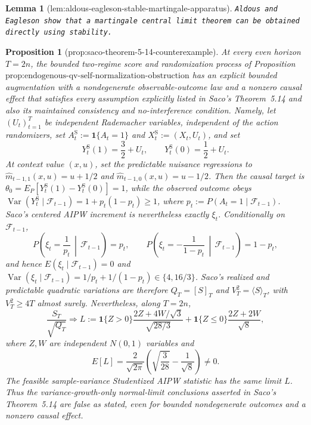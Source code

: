 \documentclass{article}
\newtheorem{lemma}{Lemma}
\newtheorem{proposition}{Proposition}
\begin{document}
\begin{lemma}[lem:aldous-eagleson-stable-martingale-apparatus]\label{lem:aldous-eagleson-stable-martingale-apparatus}
\texttt{Aldous and Eagleson show that a martingale central limit theorem can be obtained directly using stability.}
\end{lemma}

\begin{proposition}[prop:saco-theorem-5-14-counterexample]\label{prop:saco-theorem-5-14-counterexample}
At every even horizon \(T=2n\), the bounded two-regime score and randomization process of Proposition~\(\text{prop:endogenous-qv-self-normalization-obstruction}\) has an explicit bounded augmentation with a nondegenerate observable-outcome law and a nonzero causal effect that satisfies every assumption explicitly listed in Saco's Theorem~5.14 and also its maintained consistency and no-interference condition. Namely, let \((U_t)_{t=1}^T\) be independent Rademacher variables, independent of the action randomizers, set \(A_t^{\mathrm S}:=\mathbf1\{A_t=1\}\) and \(X_t^{\mathrm S}:=(X_t,U_t)\), and set
\[
 Y_t^{\mathrm S}(1)=\frac32+U_t,
 \qquad
 Y_t^{\mathrm S}(0)=\frac12+U_t.
\]
At context value \((x,u)\), set the predictable nuisance regressions to \(\widehat m_{t-1,1}(x,u)=u+1/2\) and \(\widehat m_{t-1,0}(x,u)=u-1/2\). Then the causal target is \(\theta_0=E_P[Y_t^{\mathrm S}(1)-Y_t^{\mathrm S}(0)]=1\), while the observed outcome obeys \(\operatorname{Var}(Y_t^{\mathrm S}\mid\mathcal F_{t-1})=1+p_t(1-p_t)\ge1\), where \(p_t:=P(A_t=1\mid\mathcal F_{t-1})\). Saco's centered AIPW increment is nevertheless exactly \(\xi_t\). Conditionally on \(\mathcal F_{t-1}\),
\[
 P\!\left(\xi_t=\frac1{p_t}\,\middle|\,\mathcal F_{t-1}\right)=p_t,
 \qquad
 P\!\left(\xi_t=-\frac1{1-p_t}\,\middle|\,\mathcal F_{t-1}\right)=1-p_t,
\]
and hence \(E(\xi_t\mid\mathcal F_{t-1})=0\) and \(\operatorname{Var}(\xi_t\mid\mathcal F_{t-1})=1/p_t+1/(1-p_t)\in\{4,16/3\}\). Saco's realized and predictable quadratic variations are therefore \(Q_T=[S]_T\) and \(V_T^2=\langle S\rangle_T\), with \(V_T^2\ge4T\) almost surely. Nevertheless, along \(T=2n\),
\[
 \frac{S_T}{\sqrt{Q_T}}\Longrightarrow
 L:=\mathbf1\{Z>0\}\frac{2Z+4W/\sqrt3}{\sqrt{28/3}}
 +\mathbf1\{Z\le0\}\frac{2Z+2W}{\sqrt8},
\]
where \(Z,W\) are independent \(N(0,1)\) variables and
\[
 E[L]=\frac{2}{\sqrt{2\pi}}
 \left(\sqrt{\frac3{28}}-\frac1{\sqrt8}\right)\ne0.
\]
The feasible sample-variance Studentized AIPW statistic has the same limit \(L\). Thus the variance-growth-only normal-limit conclusions asserted in Saco's Theorem~5.14 are false as stated, even for bounded nondegenerate outcomes and a nonzero causal effect.
\end{proposition}
\end{document}
